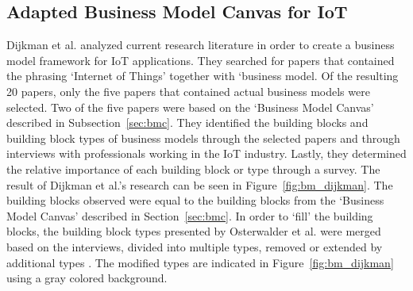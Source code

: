 	\subsection{Adapted Business Model Canvas for IoT}
	\vspace{-1em}
		Dijkman et al. \cite{dijkman} analyzed current research literature in order to create a business model framework for IoT applications. They searched for papers that contained the phrasing `Internet of Things' together with `business model. Of the resulting 20 papers, only the five papers that contained actual business models were selected. Two of the five papers were based on the `Business Model Canvas' described in Subsection~\ref{sec:bmc}. They identified the building blocks and building block types of business models through the selected papers and through interviews with professionals working in the IoT industry. Lastly, they determined the relative importance of each building block or type through a survey. The result of Dijkman et al.'s research can be seen in Figure~\ref{fig:bm_dijkman}. The building blocks observed were equal to the building blocks from the `Business Model Canvas' described in Section~\ref{sec:bmc}. In order to `fill' the building blocks, the building block types presented by Osterwalder et al. were merged based on the interviews, divided into multiple types, removed or extended by additional types \cite{osterwalder2010} \cite{dijkman}. The modified types are indicated in Figure~\ref{fig:bm_dijkman} using a gray colored background.

